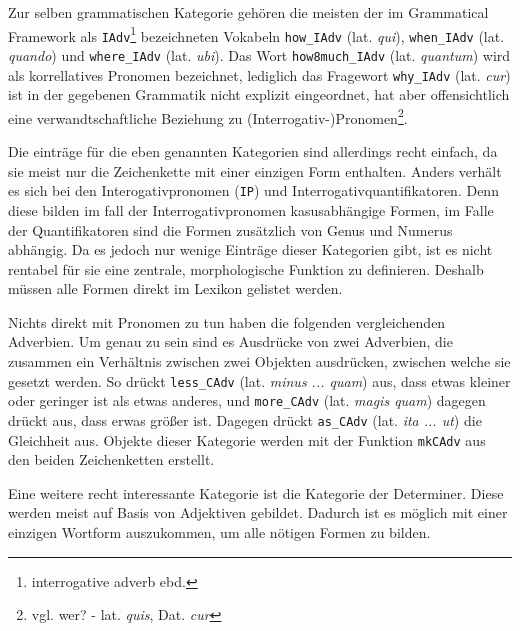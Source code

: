 \documentclass[12pt,abstract=on,titlepage,bibliography=totoc,ngerman,listof=totoc]{scrreprt}
\begin{document}
Zur selben grammatischen Kategorie gehören die meisten der im Grammatical Framework als \texttt{IAdv}\footnote{interrogative adverb ebd.} bezeichneten Vokabeln \texttt{how\_IAdv} (lat. \textit{qui}), \texttt{when\_IAdv} (lat. \textit{quando}) und \texttt{where\_IAdv} (lat. \textit{ubi}). Das Wort \texttt{how8much\_IAdv} (lat. \textit{quantum}) wird als korrellatives Pronomen bezeichnet, lediglich das Fragewort \texttt{why\_IAdv} (lat. \textit{cur}) ist in der gegebenen Grammatik nicht explizit eingeordnet, hat aber offensichtlich eine verwandtschaftliche Beziehung zu (Interrogativ-)Pronomen\footnote {vgl. wer? -  lat. \textit{quis}, Dat. \textit{cur}}. \par
Die einträge für die eben genannten Kategorien sind allerdings recht einfach, da sie meist nur die Zeichenkette mit einer einzigen Form enthalten. Anders verhält es sich bei den Interogativpronomen (\texttt{IP}) und Interrogativquantifikatoren. Denn diese bilden im fall der Interrogativpronomen kasusabhängige Formen, im Falle der Quantifikatoren sind die Formen zusätzlich von Genus und Numerus abhängig. Da es jedoch nur wenige Einträge dieser Kategorien gibt, ist es nicht rentabel für sie eine zentrale, morphologische Funktion zu definieren. Deshalb müssen alle Formen direkt im Lexikon gelistet werden. \par
Nichts direkt mit Pronomen zu tun haben die folgenden vergleichenden Adverbien. Um genau zu sein sind es Ausdrücke von zwei Adverbien, die zusammen ein Verhältnis zwischen zwei Objekten ausdrücken, zwischen welche sie gesetzt werden. So drückt \texttt{less\_CAdv} (lat. \textit{minus ... quam}) aus, dass etwas kleiner oder geringer ist als etwas anderes, und \texttt{more\_CAdv} (lat. \textit{magis quam}) dagegen drückt aus, dass erwas größer ist. Dagegen drückt \texttt{as\_CAdv} (lat. \textit{ita ... ut}) die Gleichheit aus. Objekte dieser Kategorie werden mit der Funktion \texttt{mkCAdv} aus den beiden Zeichenketten erstellt. \par
Eine weitere recht interessante Kategorie ist die Kategorie der Determiner. Diese werden meist auf Basis von Adjektiven gebildet. Dadurch ist es möglich mit einer einzigen Wortform auszukommen, um alle nötigen Formen zu bilden. \par
\end{document}
